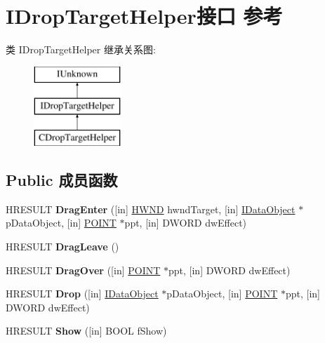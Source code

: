 \hypertarget{interface_i_drop_target_helper}{}\section{I\+Drop\+Target\+Helper接口 参考}
\label{interface_i_drop_target_helper}
类 I\+Drop\+Target\+Helper 继承关系图\+:\begin{figure}[H]
\begin{center}
\leavevmode
\includegraphics[height=3.000000cm]{interface_i_drop_target_helper}
\end{center}
\end{figure}
\subsection*{Public 成员函数}
\begin{DoxyCompactItemize}
\item 
\mbox{\label{interface_i_drop_target_helper_ac9b101678f17e4844d64e6f80964ce0d}} 
H\+R\+E\+S\+U\+LT {\bfseries Drag\+Enter} (\mbox{[}in\mbox{]} \hyperlink{interfacevoid}{H\+W\+ND} hwnd\+Target, \mbox{[}in\mbox{]} \hyperlink{interface_i_data_object}{I\+Data\+Object} $\ast$p\+Data\+Object, \mbox{[}in\mbox{]} \hyperlink{structtag_p_o_i_n_t}{P\+O\+I\+NT} $\ast$ppt, \mbox{[}in\mbox{]} D\+W\+O\+RD dw\+Effect)
\item 
\mbox{\label{interface_i_drop_target_helper_a61cf7291c56d25af1e42b9db07f66bc1}} 
H\+R\+E\+S\+U\+LT {\bfseries Drag\+Leave} ()
\item 
\mbox{\label{interface_i_drop_target_helper_a9b2a2b6bc563a68e332e3d1c853e82fd}} 
H\+R\+E\+S\+U\+LT {\bfseries Drag\+Over} (\mbox{[}in\mbox{]} \hyperlink{structtag_p_o_i_n_t}{P\+O\+I\+NT} $\ast$ppt, \mbox{[}in\mbox{]} D\+W\+O\+RD dw\+Effect)
\item 
\mbox{\label{interface_i_drop_target_helper_a570c09858efe02d68dd3abc2b5605944}} 
H\+R\+E\+S\+U\+LT {\bfseries Drop} (\mbox{[}in\mbox{]} \hyperlink{interface_i_data_object}{I\+Data\+Object} $\ast$p\+Data\+Object, \mbox{[}in\mbox{]} \hyperlink{structtag_p_o_i_n_t}{P\+O\+I\+NT} $\ast$ppt, \mbox{[}in\mbox{]} D\+W\+O\+RD dw\+Effect)
\item 
\mbox{\label{interface_i_drop_target_helper_a977e31e9ad9372bf7fa89206a4920610}} 
H\+R\+E\+S\+U\+LT {\bfseries Show} (\mbox{[}in\mbox{]} B\+O\+OL f\+Show)
\end{DoxyCompactItemize}
